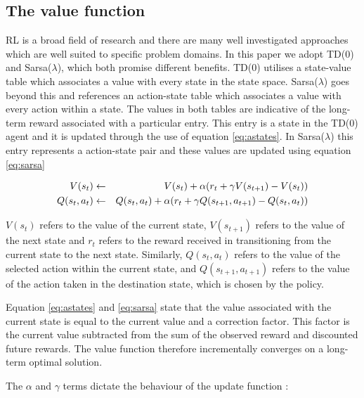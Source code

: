 \documentclass{rucsthesis}
\begin{document}
\subsection{The value function}

RL is a broad field of research and there are many well investigated approaches which are well suited to specific problem domains. In this paper we adopt TD(0) and Sarsa($\lambda$), which both promise different benefits. TD(0) utilises a state-value table which associates a value with every state in the state space. Sarsa($\lambda$) goes beyond this and references an action-state table which associates a value with every action within a state. The values in both tables are indicative of the long-term reward associated with a particular entry. This entry is a state in the TD(0) agent and it is updated through the use of equation \ref{eq:astates}. In Sarsa($\lambda$) this entry represents a action-state pair and these values are updated using equation \ref{eq:sarsa}

\begin{eqnarray}
\centering
V(s_t) & \leftarrow & V(s_t) + \alpha(r_{t} + \gamma V(s_{t+1}) - V(s_t)) \label{eq:astates} \\
Q(s_t,a_t) & \leftarrow & Q(s_t,a_t) + \alpha(r_{t} + \gamma Q(s_{t+1},a_{t+1}) - Q(s_t,a_t)) \label{eq:sarsa}
\end{eqnarray}

$V(s_t)$ refers to the value of the current state, $V(s_{t+1})$ refers to the value of the next state and $r_t$ refers to the reward received in transitioning from the current state to the next state. Similarly, $Q(s_t,a_t)$ refers to the value of the selected action within the current state, and $Q(s_{t+1},a_{t+1})$ refers to the value of the action taken in the destination state, which is chosen by the policy.

Equation \ref{eq:astates} and \ref{eq:sarsa} state that the value associated with the current state is equal to the current value and a correction factor. This factor is the current value subtracted from the sum of the observed reward and discounted future rewards. The value function therefore incrementally converges on a long-term optimal solution.

The $\alpha$ and $\gamma$ terms dictate the behaviour of the update function :
\end{document}
